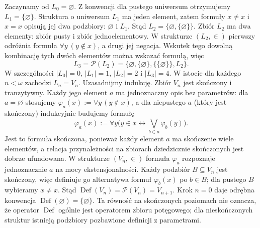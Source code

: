 \begin{przyklad}
\label{ex:l-small-levels-34}
Zaczynamy od $L_0=\varnothing$. Z konwencji dla pustego
uniwersum otrzymujemy $L_1=\{\varnothing\}$.
Struktura o uniwersum $L_1$ ma jeden element, zatem
formuły $x\ne x$ i $x=x$ opisują jej dwa podzbiory:
$\varnothing$ i $L_1$. Stąd
$L_2=\{\varnothing,\{\varnothing\}\}$.
Zbiór $L_2$ ma dwa elementy: zbiór pusty i zbiór
jednoelementowy. W strukturze $(L_2,\in)$ pierwszy
odróżnia formuła $\forall y\ (y\notin x)$,
a drugi jej negacja. Wskutek tego dowolną kombinację
tych dwóch elementów można wskazać formułą, więc
\[
 L_3=\mathcal P(L_2)
 =\{\varnothing,\{\varnothing\},
    \{\{\varnothing\}\},L_2\}.
\]
W szczególności $|L_0|=0$, $|L_1|=1$,
$|L_2|=2$ i $|L_3|=4$.
W istocie dla każdego $n<\omega$ zachodzi $L_n=V_n$.
Uzasadnijmy indukcję. Zbiór $V_n$ jest skończony i tranzytywny.
Każdy jego element $a$ ma jednoznaczny opis bez parametrów:
dla $a=\varnothing$ stosujemy $\varphi_a(x):=\forall y\,(y\notin x)$,
a dla niepustego $a$ (który jest skończony) indukcyjnie
budujemy formułę
\[
 \varphi_a(x):=\forall y\bigl(y\in x\leftrightarrow
        \bigvee_{b\in a}\varphi_b(y)\bigr).
\]
Jest to formuła skończona, ponieważ każdy element $a$
ma skończenie wiele elementów, a relacja przynależności
na zbiorach dziedzicznie skończonych jest dobrze ufundowana.
W strukturze $(V_n,\in)$ formuła $\varphi_a$ rozpoznaje
jednoznacznie $a$ na mocy ekstensjonalności.
Każdy podzbiór $B\subseteq V_n$ jest skończony, więc
definiuje go alternatywa formuł $\varphi_b(x)$ po $b\in B$;
dla pustego $B$ wybieramy $x\ne x$. Stąd
$\operatorname{Def}(V_n)=\mathcal P(V_n)=V_{n+1}$.
Krok $n=0$ daje odrębna konwencja
$\operatorname{Def}(\varnothing)=\{\varnothing\}$.
Ta równość na skończonych poziomach nie oznacza, że
operator $\operatorname{Def}$ ogólnie jest operatorem
zbioru potęgowego; dla nieskończonych struktur
istnieją podzbiory pozbawione definicji z parametrami.
\end{przyklad}

